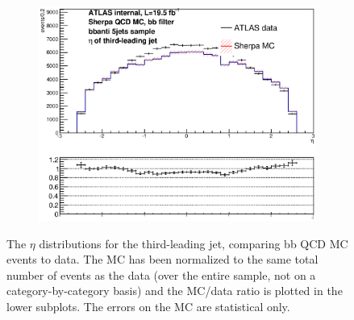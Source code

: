 \begin{figure}[phtb!]
\begin{center}
  \begin{subfigure}[$bbanti$ 5+ jet category]{0.3\textwidth}\includegraphics[width=\textwidth]{MonteCarlo/figures/eta2_bbanti_5jets.eps}\end{subfigure}
  \caption{The $\eta$ distributions for the third-leading jet, comparing bb QCD MC events to data.  The MC has been normalized
  to the same total number of events as the data (over the entire sample, not on a category-by-category basis)
  and the MC/data ratio is plotted in the lower subplots.  The errors on the MC are statistical only.
  \label{fig:bb_qcd_mc_eta2}}
    \end{center}
\end{figure}








